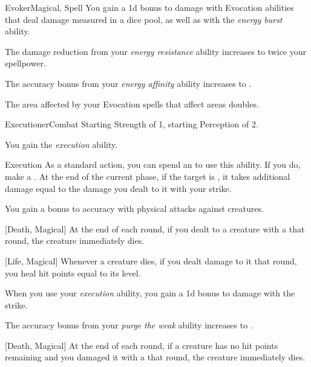\begin{feat}{Evoker}{Magical, Spell}
         You gain a \plus1d bonus to damage with Evocation abilities that deal damage measured in a dice pool, as well as with the \textit{energy burst} ability.

         The damage reduction from your \textit{energy resistance} ability increases to twice your spellpower.

         The accuracy bonus from your \textit{energy affinity} ability increases to .

         The area affected by your Evocation spells that affect areas doubles.
    \end{feat}

    \begin{feat}{Executioner}{Combat}
        \featpres Starting Strength of 1, starting Perception of 2.

         You gain the \textit{execution} ability.
        \begin{ability}{Execution}
            As a standard action, you can spend an  to use this ability.
            If you do, make a .
            At the end of the current phase, if the target is , it takes additional damage equal to the damage you dealt to it with your strike.
        \end{ability}

         You gain a  bonus to accuracy with physical attacks against  creatures.

        [Death, Magical] At the end of each round, if you dealt  to a creature with a  that round, the creature immediately dies.

        [Life, Magical] Whenever a creature dies, if you dealt damage to it that round, you heal hit points equal to its level.

         When you use your \textit{execution} ability, you gain a \plus1d bonus to damage with the strike.

         The accuracy bonus from your \textit{purge the weak} ability increases to .

        [Death, Magical] At the end of each round, if a creature has no hit points remaining and you damaged it with a  that round, the creature immediately dies.


\end{feat}
